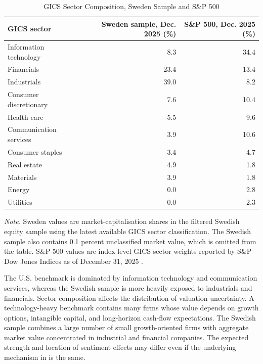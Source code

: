 \documentclass[11pt]{article}
\begin{document}
\begin{table}[H]
\centering
\caption{GICS Sector Composition, Sweden Sample and S\&P 500}
\label{tabmarketsectorcomparison}
\small
\begin{tabularx}{0.92\textwidth}{Xrr}
\toprule
GICS sector & Sweden sample, Dec. 2025 (\%) & S\&P 500, Dec. 2025 (\%) \\
\midrule
Information technology & 8.3 & 34.4 \\
Financials & 23.4 & 13.4 \\
Industrials & 39.0 & 8.2 \\
Consumer discretionary & 7.6 & 10.4 \\
Health care & 5.5 & 9.6 \\
Communication services & 3.9 & 10.6 \\
Consumer staples & 3.4 & 4.7 \\
Real estate & 4.9 & 1.8 \\
Materials & 3.9 & 1.8 \\
Energy & 0.0 & 2.8 \\
Utilities & 0.0 & 2.3 \\
\bottomrule
\end{tabularx}
\begin{minipage}{0.92\textwidth}
\footnotesize \textit{Note.} Sweden values are market-capitalisation shares in the filtered Swedish equity sample using the latest available GICS sector classification. The Swedish sample also contains 0.1 percent unclassified market value, which is omitted from the table. S\&P 500 values are index-level GICS sector weights reported by S\&P Dow Jones Indices as of December 31, 2025 \citep{spglobal2026marketattributes}.
\end{minipage}
\end{table}

The U.S. benchmark is dominated by information technology and communication services, whereas the Swedish sample is more heavily exposed to industrials and financials. Sector composition affects the distribution of valuation uncertainty. A technology-heavy benchmark contains many firms whose value depends on growth options, intangible capital, and long-horizon cash-flow expectations. The Swedish sample combines a large number of small growth-oriented firms with aggregate market value concentrated in industrial and financial companies. The expected strength and location of sentiment effects may differ even if the underlying mechanism in \citet{baker2006sentiment} is the same.
\end{document}
